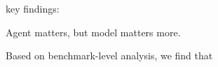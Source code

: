 key findings:

Agent matters, but model matters more.

Based on benchmark-level analysis, we find that 


